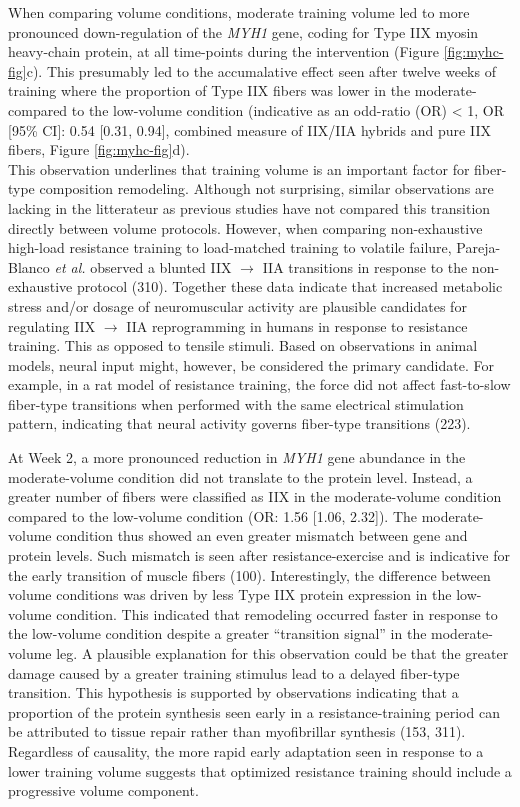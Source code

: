 \documentclass[twoside,10pt]{gihclass} %
\begin{document}
When comparing volume conditions, moderate training volume led to more pronounced down-regulation of the \emph{MYH1} gene, coding for Type IIX myosin heavy-chain protein, at all time-points during the intervention (Figure \ref{fig:myhc-fig}c). This presumably led to the accumalative effect seen after twelve weeks of training where the proportion of Type IIX fibers was lower in the moderate- compared to the low-volume condition (indicative as an odd-ratio (OR) \textless{} 1, OR {[}95\% CI{]}: 0.54 {[}0.31, 0.94{]}, combined measure of IIX/IIA hybrids and pure IIX fibers, Figure \ref{fig:myhc-fig}d).\\
This observation underlines that training volume is an important factor for fiber-type composition remodeling. Although not surprising, similar observations are lacking in the litterateur as previous studies have not compared this transition directly between volume protocols.
However, when comparing non-exhaustive high-load resistance training to load-matched training to volatile failure, Pareja-Blanco \emph{et al.} observed a blunted IIX \(\rightarrow\) IIA transitions in response to the non-exhaustive protocol
(310).
Together these data indicate that increased metabolic stress and/or dosage of neuromuscular activity are plausible candidates for regulating IIX \(\rightarrow\) IIA reprogramming in humans in response to resistance training.
This as opposed to tensile stimuli.
Based on observations in animal models, neural input might, however, be considered the primary candidate.
For example, in a rat model of resistance training, the force did not affect fast-to-slow fiber-type transitions when performed with the same electrical stimulation pattern, indicating that neural activity governs fiber-type transitions
(223).

At Week 2, a more pronounced reduction in \emph{MYH1} gene abundance in the moderate-volume condition did not translate to the protein level. Instead, a greater number of fibers were classified as IIX in the moderate-volume condition compared to the low-volume condition (OR: 1.56 {[}1.06, 2.32{]}).
The moderate-volume condition thus showed an even greater mismatch between gene and protein levels.
Such mismatch is seen after resistance-exercise and is indicative for the early transition of muscle fibers
(100).
Interestingly, the difference between volume conditions was driven by less Type IIX protein expression in the low-volume condition.
This indicated that remodeling occurred faster in response to the low-volume condition despite a greater ``transition signal'' in the moderate-volume leg.
A plausible explanation for this observation could be that the greater damage caused by a greater training stimulus lead to a delayed fiber-type transition.
This hypothesis is supported by observations indicating that a proportion of the protein synthesis seen early in a resistance-training period can be attributed to tissue repair rather than myofibrillar synthesis
(153, 311).
Regardless of causality, the more rapid early adaptation seen in response to a lower training volume suggests that optimized resistance training should include a progressive volume component.
\end{document}
